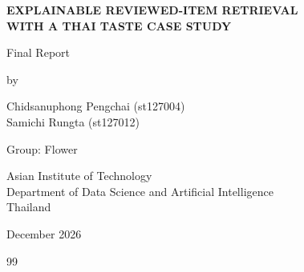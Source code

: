 \documentclass[12pt]{report}
\begin{document}
\begin{titlepage}
\singlespacing
\begin{center}
\vspace*{1.2cm}
{\LARGE\bfseries EXPLAINABLE REVIEWED-ITEM RETRIEVAL\\[0.5em]
WITH A THAI TASTE CASE STUDY\par}

\vspace{1.2cm}
{\large Final Report\par}

\vspace{1.8cm}
{\large by\par}

\vspace{0.6cm}
{\large Chidsanuphong Pengchai (st127004)\\[0.4em]
Samichi Rungta (st127012)\par}

\vspace{1.5cm}
{\large Group: Flower\par}

\vspace{1.8cm}
{\large Asian Institute of Technology\\[0.3em]
Department of Data Science and Artificial Intelligence\\[0.3em]
Thailand\par}

\vspace{1.2cm}
{\large December 2026\par}
\end{center}
\end{titlepage}

\singlespacing
\tableofcontents
\listoffigures
\listoftables
\clearpage
\onehalfspacing










\clearpage
\singlespacing
\begin{thebibliography}{99}

\end{thebibliography}
\end{document}
